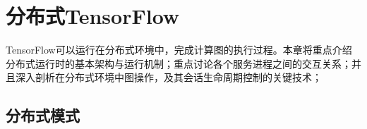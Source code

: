 \begin{savequote}[45mm]
\end{savequote}

\chapter{分布式TensorFlow} 
\label{ch:distributed}

\begin{content}

TensorFlow可以运行在分布式环境中，完成计算图的执行过程。本章将重点介绍 分布式运行时的基本架构与运行机制；重点讨论各个服务进程之间的交互关系；并且深入剖析在分布式环境中图操作，及其会话生命周期控制的关键技术；

\end{content}

\section{分布式模式}

